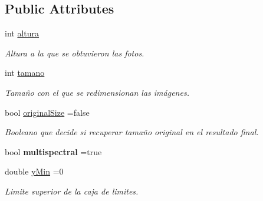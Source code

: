\subsection*{Public Attributes}
\begin{DoxyCompactItemize}
\item 
\mbox{\label{classuav_1_1Stitcher_a4dc4cd0546fef7f43b85d9079ea09f86}} 
int \mbox{\hyperlink{classuav_1_1Stitcher_a4dc4cd0546fef7f43b85d9079ea09f86}{altura}}
\begin{DoxyCompactList}\small\item\em Altura a la que se obtuvieron las fotos. \end{DoxyCompactList}\item 
\mbox{\label{classuav_1_1Stitcher_aecfe8592eb3d8445c0f3e8b722558acb}} 
int \mbox{\hyperlink{classuav_1_1Stitcher_aecfe8592eb3d8445c0f3e8b722558acb}{tamano}}
\begin{DoxyCompactList}\small\item\em Tamaño con el que se redimensionan las imágenes. \end{DoxyCompactList}\item 
\mbox{\label{classuav_1_1Stitcher_a222f8247abb4fafba61d86078d8f9c16}} 
bool \mbox{\hyperlink{classuav_1_1Stitcher_a222f8247abb4fafba61d86078d8f9c16}{original\+Size}} =false
\begin{DoxyCompactList}\small\item\em Booleano que decide si recuperar tamaño original en el resultado final. \end{DoxyCompactList}\item 
\mbox{\label{classuav_1_1Stitcher_a6bce3205d9b7c7e6204918f5e5802023}} 
bool {\bfseries multispectral} =true
\item 
\mbox{\label{classuav_1_1Stitcher_a4b793c80fbb1052781b3787e90d19f97}} 
double \mbox{\hyperlink{classuav_1_1Stitcher_a4b793c80fbb1052781b3787e90d19f97}{y\+Min}} =0
\begin{DoxyCompactList}\small\item\em Limite superior de la caja de limites. \end{DoxyCompactList}\item 
\mbox{\label{classuav_1_1Stitcher_ae5ef4cb4ade964a9ff73c8228db26f6a}} 

\end{DoxyCompactItemize}
